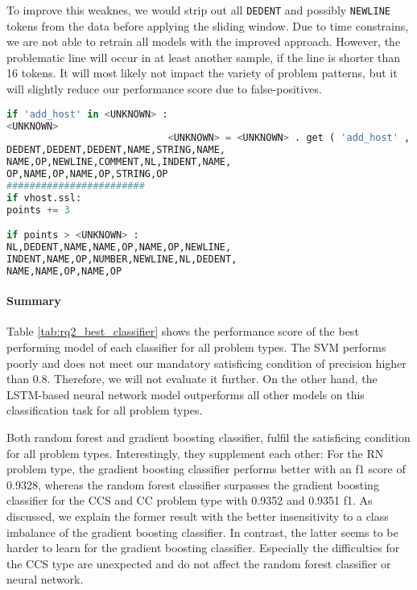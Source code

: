 To improve this weaknes, we would strip out all \texttt{DEDENT} and possibly \texttt{NEWLINE} tokens from the data before applying the sliding window. Due to time constrains, we are not able to retrain all models with the improved approach. However, the problematic line will occur in at least another sample, if the line is shorter than 16 tokens. It will most likely not impact the variety of problem patterns, but it will slightly reduce our performance score due to false-positives.


\begin{lstlisting}[float,floatplacement=H, language=Python, label=lst:weaknes_end_start_sliding_window, caption={False-positives of the best gradient boosting classifier with 300 boosting stages, a learning rate of 0.2, type encoding and without resampling for the CCS type. In the first sample, not all preceding \texttt{DEDENT} tokens are in this window. For the second example, the trailing \texttt{NEWLINE} token is missing in the window. Without this encoding issue, both samples would have been detected correctly.}]
if 'add_host' in <UNKNOWN> : 
<UNKNOWN> 
                            <UNKNOWN> = <UNKNOWN> . get ( 'add_host' ,
DEDENT,DEDENT,DEDENT,NAME,STRING,NAME,
NAME,OP,NEWLINE,COMMENT,NL,INDENT,NAME,
OP,NAME,OP,NAME,OP,STRING,OP
########################
if vhost.ssl: 
points += 3 

if points > <UNKNOWN> :
NL,DEDENT,NAME,NAME,OP,NAME,OP,NEWLINE,
INDENT,NAME,OP,NUMBER,NEWLINE,NL,DEDENT,
NAME,NAME,OP,NAME,OP
\end{lstlisting}


\paragraph{Summary}

 Table \ref{tab:rq2_best_classifier} shows the performance score of the best performing model of each classifier for all problem types.
 The SVM performs poorly and does not meet our mandatory satisficing condition of precision higher than 0.8. Therefore, we will not evaluate it further. On the other hand, the LSTM-based neural network model outperforms all other models on this classification task for all problem types.

 Both random forest and gradient boosting classifier, fulfil the satisficing condition for all problem types. Interestingly, they supplement each other: For the RN problem type, the gradient boosting classifier performs better with an f1 score of 0.9328, whereas the random forest classifier surpasses the gradient boosting classifier for the CCS and CC problem type with 0.9352 and 0.9351 f1. As discussed, we explain the former result with the better insensitivity to a class imbalance of the gradient boosting classifier. In contrast, the latter seems to be harder to learn for the gradient boosting classifier. Especially the difficulties for the CCS type are unexpected and do not affect the random forest classifier or neural network.

